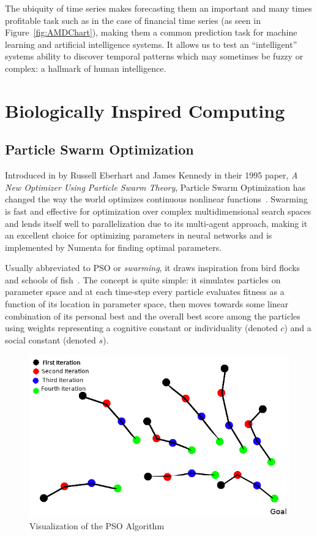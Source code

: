 \documentclass[oneside,12pt,openany]{book}
\begin{document}
	The ubiquity of time series makes forecasting them an important and many times profitable task such as in the case of financial time series (as seen in Figure~\ref{fig:AMDChart}), making them a common prediction task for machine learning and artificial intelligence systems. It allows us to test an ``intelligent'' systems ability to discover temporal patterns which may sometimes be fuzzy or complex: a hallmark of human intelligence.
	
	
	
	
	
	
	
	\chapter{Biologically Inspired Computing}
	
	\section{Particle Swarm Optimization}
	
	Introduced in by Russell Eberhart and James Kennedy in their 1995 paper, \textit{A New Optimizer Using Particle Swarm Theory}, Particle Swarm Optimization has changed the way the world optimizes continuous nonlinear functions~\cite{PSOReview}. Swarming is fast and effective for optimization over complex multidimensional search spaces and lends itself well to parallelization due to its multi-agent approach, making it an excellent choice for optimizing parameters in neural networks and is implemented by Numenta for finding optimal parameters.
	
	Usually abbreviated to PSO or \textit{swarming}, it draws inspiration from bird flocks and schools of fish~\cite{Eberhart}. The concept is quite simple: it simulates particles on parameter space and at each time-step every particle evaluates fitness as a function of its location in parameter space, then moves towards some linear combination of its personal best and the overall best score among the particles using weights representing a cognitive constant or individuality (denoted $c$) and a social constant (denoted $s$).
	
	\begin{figure}[!ht]
		\centering
		\includegraphics[width=.7\linewidth]{images/PSOVisual.png}
		\caption{Visualization of the PSO Algorithm}
		\label{fig:PSOVisual}
	\end{figure}
	
\end{document}
